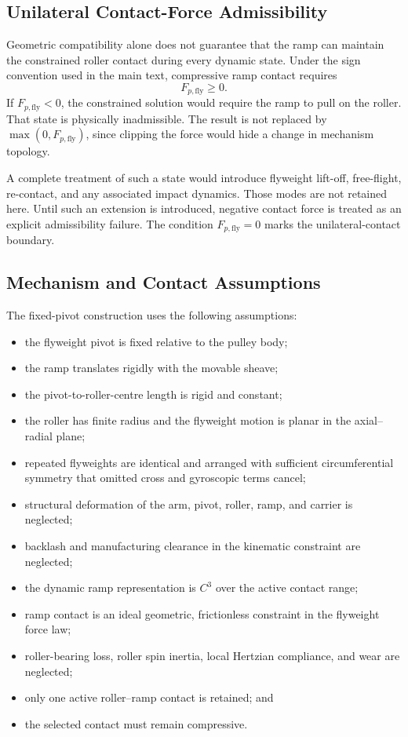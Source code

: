 \documentclass[11pt]{report}
\numberwithin{equation}{section}
\newcounter{assump}
\begin{document}
\subsection{Unilateral Contact-Force Admissibility}

Geometric compatibility alone does not guarantee that the ramp can maintain the
constrained roller contact during every dynamic state. Under the sign convention
used in the main text, compressive ramp contact requires
\begin{equation}
    \boxed{
    F_{p,\mathrm{fly}}\ge0.
    }
    \label{eq:appB_contact_force_admissible}
\end{equation}
If \(F_{p,\mathrm{fly}}<0\), the constrained solution would require the ramp to
pull on the roller. That state is physically inadmissible. The result is not
replaced by \(\max(0,F_{p,\mathrm{fly}})\), since clipping the force would hide
a change in mechanism topology.

A complete treatment of such a state would introduce flyweight lift-off,
free-flight, re-contact, and any associated impact dynamics. Those modes are
not retained here. Until such an extension is introduced, negative contact
force is treated as an explicit admissibility failure. The condition
\(F_{p,\mathrm{fly}}=0\) marks the unilateral-contact boundary.

\subsection{Mechanism and Contact Assumptions}

The fixed-pivot construction uses the following assumptions:
\begin{itemize}
    \item the flyweight pivot is fixed relative to the pulley body;
    \item the ramp translates rigidly with the movable sheave;
    \item the pivot-to-roller-centre length is rigid and constant;
    \item the roller has finite radius and the flyweight motion is planar in the axial--radial plane;
    \item repeated flyweights are identical and arranged with sufficient circumferential symmetry that omitted cross and gyroscopic terms cancel;
    \item structural deformation of the arm, pivot, roller, ramp, and carrier is neglected;
    \item backlash and manufacturing clearance in the kinematic constraint are neglected;
    \item the dynamic ramp representation is \(C^3\) over the active contact range;
    \item ramp contact is an ideal geometric, frictionless constraint in the flyweight force law;
    \item roller-bearing loss, roller spin inertia, local Hertzian compliance, and wear are neglected;
    \item only one active roller--ramp contact is retained; and
    \item the selected contact must remain compressive.
\end{itemize}
\end{document}
